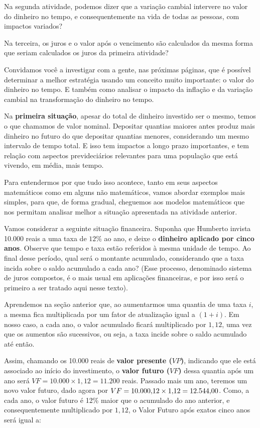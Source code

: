 Na segunda atividade, podemos dizer que a variação cambial intervere no valor do dinheiro no tempo, e consequentemente na vida de todas as pessoas, com impactos variados?

Na terceira, os juros e o valor após o vencimento são calculados da mesma forma que seriam calculados os juros da primeira atividade?

Convidamos você a investigar com a gente, nas próximas páginas, que é possível determinar a melhor estratégia usando um conceito muito importante: o valor do dinheiro no tempo. E também como analisar o impacto da inflação e da variação cambial na transformação do dinheiro no tempo.

Na \textbf{primeira situação}, apesar do total de dinheiro investido ser o mesmo, temos o que chamamos de valor nominal. Depositar quantias maiores antes produz mais dinheiro no futuro do que depositar quantias menores, considerando um mesmo intervalo de tempo total. E isso tem impactos a longo prazo importantes, e tem relação com aspectos prevideciários relevantes para uma população que está vivendo, em média, mais tempo.

Para entendermos por que tudo isso acontece, tanto em seus aspectos matemáticos como em alguns não matemáticos, vamos abordar exemplos mais simples, para que, de forma gradual, cheguemos aos modelos matemáticos que nos permitam analisar melhor a situação apresentada na atividade anterior.

Vamos considerar a seguinte situação financeira. Suponha que Humberto invista 10.000 reais a uma taxa de $12$\% ao ano, e deixe o \textbf{dinheiro aplicado por cinco anos}. Observe que tempo e taxa estão referidos à mesma unidade de tempo. Ao final desse período, qual será o montante acumulado, considerando que a taxa incida sobre o saldo acumulado a cada ano? (Esse processo, denominado sistema de juros compostos, é o mais usual em aplicações financeiras, e por isso será o primeiro a ser tratado aqui nesse texto).

Aprendemos na seção anterior que, ao aumentarmos uma quantia de uma taxa $i$, a mesma fica multiplicada por um fator de atualização igual a $(1+i)$. Em nosso caso, a cada ano, o valor acumulado ficará multiplicado por $1,12$, uma vez que os aumentos são sucessivos, ou seja, a taxa incide sobre o saldo acumulado até então.

Assim, chamando os 10.000 reais de \textbf{valor presente ($VP$)}, indicando que ele está associado ao início do investimento, o \textbf{valor futuro ($VF$)} dessa quantia após um ano será $VF = 10.000\times1{,}12 = 11.200$ reais. Passado mais um ano, teremos um novo valor futuro, dado agora por $VF = 10.000 \time 1{,}12 \times1{,}12 = 12.544{,}00$. Como, a cada ano, o valor futuro é 12\% maior que o acumulado do ano anterior, e consequentemente multiplicado por $1{,}12$, o Valor Futuro após exatos cinco anos será igual a:

